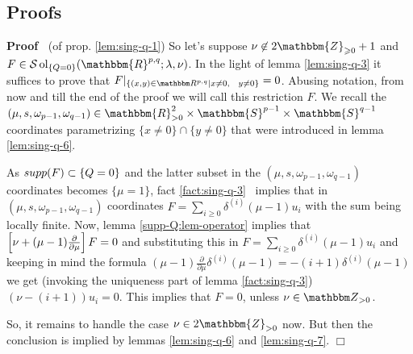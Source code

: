 \documentclass{article}
\newcommand{\nin}{\not\in}
\newcommand{\tmop}[1]{\ensuremath{\operatorname{#1}}}
\newenvironment{proof}{\noindent\textbf{Proof\ }}{\hspace*{\fill}$\Box$\medskip}
\numberwithin{definition}{section}
\numberwithin{lemma}{section}
\numberwithin{proposition}{section}
{\theorembodyfont{\rmfamily}\newtheorem{remark}{Remark}
\numberwithin{remark}{section}
}
\newcommand{\proofexplanation}[1]{(#1)}
\begin{document}
\subsection{Proofs}

\begin{proof}
  {\proofexplanation{of prop. \ref{lem:sing-q-1}}} So let's suppose $\nu \nin
  2\mathbbm{Z}_{\geqslant 0} + 1$ and $F \in \mathcal{S} \tmop{ol}_{\{ Q = 0
  \}} ( \mathbbm{R}^{p, q} ; \lambda, \nu)$. In the light of lemma
  \ref{lem:sing-q-3} it suffices to prove that $F |_{\{ (x, y) \in \R^{p, q}
  |x \neq 0, \hspace{0.75em} y \neq 0\}} = 0$. Abusing notation, from now and
  till the end of the proof we will call this restriction $F$. We recall the
  $(\mu, s, \omega_{p - 1}, \omega_{q - 1}) \in \mathbbm{R}_{> 0}^2 \times
  \mathbbm{S}^{p - 1} \times \mathbbm{S}^{q - 1}$ coordinates parametrizing
  $\{ x \neq 0 \} \cap \{ y \neq 0 \}$ that were introduced in lemma
  \ref{lem:sing-q-6}.
  
  As $supp (F) \subset \{ Q = 0 \}$ and the latter subset in the $(\mu, s,
  \omega_{p - 1}, \omega_{q - 1})$ coordinates becomes $\{ \mu = 1 \}$, fact
  \ref{fact:sing-q-3} \ implies that in $(\mu, s, \omega_{p - 1}, \omega_{q -
  1})$ coordinates $F = \sum_{i \geq 0} \delta^{(i)}  (\mu - 1) u_i$ with the
  sum being locally finite. Now, lemma \ref{supp-Q:lem-operator} implies that
  $\left[\nu + (\mu - 1)  \frac{\partial}{\partial \mu}\right] F = 0$ and
  substituting this in $F = \sum_{i \geq 0} \delta^{(i)}  (\mu - 1) u_i$ and
  keeping in mind the formula $(\mu - 1)  \frac{\partial}{\partial \mu}
  \delta^{(i)}  (\mu - 1) = - (i + 1) \delta^{(i)}  (\mu - 1)$ we get
  (invoking the uniqueness part of lemma \ref{fact:sing-q-3}) $(\nu - (i + 1))
  u_i = 0$. This implies that $F = 0$, unless $\nu \in \Z_{> 0}$.
  
  So, it remains to handle the case $\nu \in 2\mathbbm{Z}_{> 0}$ now. But then
  the conclusion is implied by lemmas \ref{lem:sing-q-6} and
  \ref{lem:sing-q-7}.
\end{proof}
\end{document}
